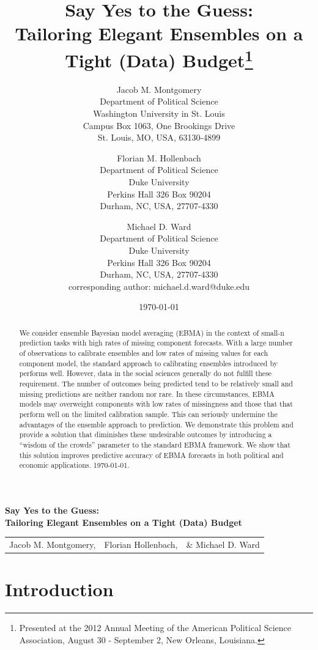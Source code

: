 \documentclass[12pt,fullpage,endnotes]{article}
\title{Say Yes to the Guess: \\ Tailoring Elegant Ensembles on a Tight
  (Data) Budget\thanks{Presented at the 2012 Annual Meeting of the American Political Science Association, August 30 - September 2, New Orleans, Louisiana. 
    }}
\author{
Jacob M. Montgomery\\
	Department of Political Science\\
	Washington University in St. Louis\\
	Campus Box 1063, One Brookings Drive\\
	St. Louis, MO, USA, 63130-4899 
	\and
Florian M. Hollenbach  \\
	Department of Political Science\\
	Duke University\\
	Perkins Hall 326 Box 90204\\
	Durham, NC, USA, 27707-4330
	\and
Michael D. Ward\\
	Department of Political Science\\
	Duke University\\
	Perkins Hall 326 Box 90204\\
	Durham, NC, USA, 27707-4330\\
	corresponding author: michael.d.ward@duke.edu
}
\date{\today}
\begin{document}
\maketitle
\thispagestyle{empty}
\clearpage
\pagestyle{myheadings}
\newpage
\singlespacing

\thispagestyle{empty}

{\centering \bf \large Say Yes to the Guess: \\ Tailoring Elegant Ensembles on a Tight (Data) Budget \\}

\begin{center}
\begin{tabular}{ccc}
Jacob M. Montgomery, & Florian Hollenbach, & \& Michael D. Ward\\
\end{tabular}
\end{center}

\begin{abstract}
  \noindent We consider ensemble Bayesian model averaging (EBMA) in
  the context of small-n prediction tasks with high rates of missing
  component forecasts.  With a large number of observations to
  calibrate ensembles and low rates of missing values for each
  component model, the standard approach to calibrating ensembles
  introduced by \cite{Raftery:2005} performs well. However, data in
  the social sciences generally do not fulfill these requirement. The
  number of outcomes being predicted tend to be relatively small and
  missing predictions are neither random nor rare. In these
  circumstances, EBMA models may overweight components with low rates
  of missingness and those that that perform well on the limited
  calibration sample.  This can seriously undermine the advantages of
  the ensemble approach to prediction.  We demonstrate this problem
  and provide a solution that diminishes these undesirable outcomes by
  introducing a ``wisdom of the crowds'' parameter to the standard
  EBMA framework. We show that this solution improves predictive
  accuracy of EBMA forecasts in both political and economic
  applications.  \today.
\end{abstract}



\setcounter{page}{1}

\section{Introduction}
\end{document}
